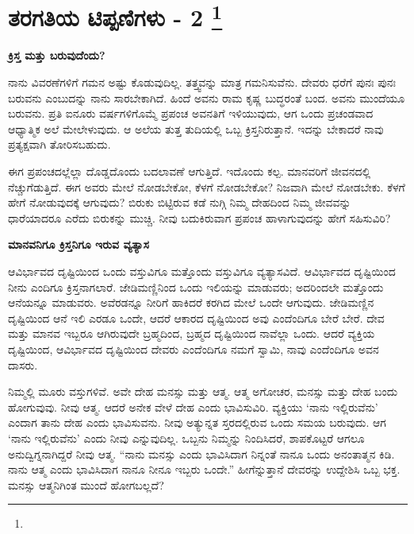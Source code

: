 
\vspace{-1cm}

\chapter[ತರಗತಿಯ ಟಿಪ್ಪಣಿಗಳು - 2 ]{ತರಗತಿಯ ಟಿಪ್ಪಣಿಗಳು - 2 \protect\footnote{}}

\begin{center}
\textbf{ಕ್ರಿಸ್ತ ಮತ್ತು ಬರುವುದೆಂದು?}
\end{center}

ನಾನು ವಿವರಣೆಗಳಿಗೆ ಗಮನ ಅಷ್ಟು ಕೊಡುವುದಿಲ್ಲ. ತತ್ತ್ವವನ್ನು ಮಾತ್ರ ಗಮನಿಸುವೆನು. ದೇವರು ಧರೆಗೆ ಪುನಃ ಪುನಃ ಬರುವನು ಎಂಬುದನ್ನು ನಾನು ಸಾರಬೇಕಾಗಿದೆ. ಹಿಂದೆ ಅವನು ರಾಮ ಕೃಷ್ಣ ಬುದ್ಧರಂತೆ ಬಂದ. ಅವನು ಮುಂದೆಯೂ ಬರುವನು. ಪ್ರತಿ ಐನೂರು ವರ್ಷಗಳಿಗೊಮ್ಮೆ ಪ್ರಪಂಚ ಅವನತಿಗೆ ಇಳಿಯುವುದು, ಆಗ ಒಂದು ಪ್ರಚಂಡವಾದ ಆಧ್ಯಾತ್ಮಿಕ ಅಲೆ ಮೇಲೇಳುವುದು. ಆ ಅಲೆಯ ತುತ್ತ ತುದಿಯಲ್ಲಿ ಒಬ್ಬ ಕ್ರಿಸ್ತನಿರುತ್ತಾನೆ. ಇದನ್ನು ಬೇಕಾದರೆ ನಾವು ಪ್ರತ್ಯಕ್ಷವಾಗಿ ತೋರಿಸಬಹುದು.

ಈಗ ಪ್ರಪಂಚದಲ್ಲೆಲ್ಲಾ ದೊಡ್ಡದೊಂದು ಬದಲಾವಣೆ ಆಗುತ್ತಿದೆ. ಇದೊಂದು ಕಲ್ಪ. ಮಾನವರಿಗೆ ಜೀವನದಲ್ಲಿ ನೆಚ್ಚುಗೆಡುತ್ತಿದೆ. ಈಗ ಅವರು ಮೇಲೆ ನೋಡಬೇಕೋ, ಕೆಳಗೆ ನೋಡಬೇಕೋ? ನಿಜವಾಗಿ ಮೇಲೆ ನೋಡಬೇಕು. ಕೆಳಗೆ ಹೇಗೆ ನೋಡುವುದಕ್ಕೆ ಆಗುವುದು? ಬಿರುಕು ಬಿಟ್ಟಿರುವ ಕಡೆ ನುಗ್ಗಿ ನಿಮ್ಮ ದೇಹದಿಂದ ನಿಮ್ಮ ಜೀವವನ್ನು ಧಾರೆಯಾದರೂ ಎರೆದು ಬಿರುಕನ್ನು ಮುಚ್ಚಿ. ನೀವು ಬದುಕಿರುವಾಗ ಪ್ರಪಂಚ ಹಾಳಾಗುವುದನ್ನು ಹೇಗೆ ಸಹಿಸುವಿರಿ?

\begin{center}
\textbf{ಮಾನವನಿಗೂ ಕ್ರಿಸ್ತನಿಗೂ ಇರುವ ವ್ಯತ್ಯಾಸ}
\end{center}

\vspace{-1cm}

ಆವಿರ್ಭಾವದ ದೃಷ್ಟಿಯಿಂದ ಒಂದು ವಸ್ತುವಿಗೂ ಮತ್ತೊಂದು ವಸ್ತುವಿಗೂ ವ್ಯತ್ಯಾಸವಿದೆ. ಆವಿರ್ಭಾವದ ದೃಷ್ಟಿಯಿಂದ ನೀನು ಎಂದಿಗೂ ಕ್ರಿಸ್ತನಾಗಲಾರೆ. ಜೇಡಿಮಣ್ಣಿನಿಂದ ಒಂದು ಇಲಿಯನ್ನು ಮಾಡುವರು; ಅದರಿಂದಲೇ ಮತ್ತೊಂದು ಆನೆಯನ್ನೂ ಮಾಡುವರು. ಅವೆರಡನ್ನೂ ನೀರಿಗೆ ಹಾಕಿದರೆ ಕರಗಿದ ಮೇಲೆ ಒಂದೇ ಆಗುವುದು. ಜೇಡಿಮಣ್ಣಿನ ದೃಷ್ಟಿಯಿಂದ ಆನೆ ಇಲಿ ಎರಡೂ ಒಂದೇ, ಆದರೆ ಆಕಾರದ ದೃಷ್ಟಿಯಿಂದ ಅವು ಎಂದೆಂದಿಗೂ ಬೇರೆ ಬೇರೆ. ದೇವ ಮತ್ತು ಮಾನವ ಇಬ್ಬರೂ ಆಗಿರುವುದೇ ಬ್ರಹ್ಮದಿಂದ, ಬ್ರಹ್ಮದ ದೃಷ್ಟಿಯಿಂದ ನಾವೆಲ್ಲಾ ಒಂದು. ಆದರೆ ವ್ಯಕ್ತಿಯ ದೃಷ್ಟಿಯಿಂದ, ಆವಿರ್ಭಾವದ ದೃಷ್ಟಿಯಿಂದ ದೇವರು ಎಂದೆಂದಿಗೂ ನಮಗೆ ಸ್ವಾಮಿ, ನಾವು ಎಂದೆಂದಿಗೂ ಅವನ ದಾಸರು.

ನಿಮ್ಮಲ್ಲಿ ಮೂರು ವಸ್ತುಗಳಿವೆ. ಅವೇ ದೇಹ ಮನಸ್ಸು ಮತ್ತು ಆತ್ಮ. ಆತ್ಮ ಅಗೋಚರ, ಮನಸ್ಸು ಮತ್ತು ದೇಹ ಬಂದು ಹೋಗುವುವು. ನೀವು ಆತ್ಮ. ಆದರೆ ಅನೇಕ ವೇಳೆ ದೇಹ ಎಂದು ಭಾವಿಸುವಿರಿ. ವ್ಯಕ್ತಿಯು ‘ನಾನು ಇಲ್ಲಿರುವೆನು’ ಎಂದಾಗ ತಾನು ದೇಹ ಎಂದು ಭಾವಿಸುವನು. ನೀವು ಅತ್ಯುನ್ನತ ಸ್ತರದಲ್ಲಿರುವ ಒಂದು ಸಮಯ ಬರುವುದು. ಆಗ ‘ನಾನು ಇಲ್ಲಿರುವೆನು’ ಎಂದು ನೀವು ಎನ್ನುವುದಿಲ್ಲ. ಒಬ್ಬನು ನಿಮ್ಮನ್ನು ನಿಂದಿಸಿದರೆ, ಶಾಪಕೊಟ್ಟರೆ ಆಗಲೂ ಅನುದ್ವಿಗ್ನನಾಗಿದ್ದರೆ ನೀವು ಆತ್ಮ. “ನಾನು ಮನಸ್ಸು ಎಂದು ಭಾವಿಸಿದಾಗ ನಿನ್ನಂತೆ ನಾನೂ ಒಂದು ಅನಂತಾತ್ಮನ ಕಿಡಿ. ನಾನು ಆತ್ಮ ಎಂದು ಭಾವಿಸಿದಾಗ ನಾನೂ ನೀನೂ ಇಬ್ಬರು ಒಂದೇ.” ಹೀಗೆನ್ನುತ್ತಾನೆ ದೇವರನ್ನು ಉದ್ದೇಶಿಸಿ ಒಬ್ಬ ಭಕ್ತ. ಮನಸ್ಸು ಆತ್ಮನಿಗಿಂತ ಮುಂದೆ ಹೋಗಬಲ್ಲದೆ?

